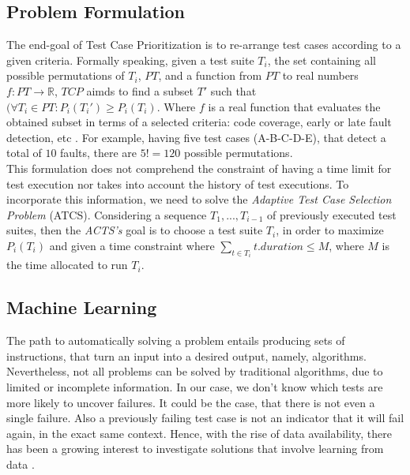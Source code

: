 \subsection{Problem Formulation}

The end-goal of Test Case Prioritization is to re-arrange test cases according to a given criteria. Formally speaking, given a test suite $T_i$, the set containing all possible permutations of $T_i$, $PT$, and a function from $PT$ to real numbers $f : PT \rightarrow \mathbb{R}$, $TCP$ aimds to find a subset $T'$ such that $(\forall T_i \in PT: P_i(T_i') \ge P_i(T_i).$ Where $f$ is a real function that evaluates the obtained subset in terms of a selected criteria: code coverage, early or late fault detection, etc \cite{ShinThesis}. For example, having five test cases (A-B-C-D-E), that detect a total of $10$ faults, there are $5! = 120$ possible permutations.
\\

This formulation does not comprehend the constraint of having a time limit for test execution nor takes into account the history of test executions. To incorporate this information, we need to solve the \textit{Adaptive Test Case Selection Problem} (ATCS). Considering a sequence $T_1, ..., T_{i-1}$ of previously executed test suites, then the \textit{ACTS's} goal is to choose a test suite $T_i$, in order to maximize $P_i(T_i)$ and given a time constraint where $\sum_{t \in T_i} t.duration \le M$, where $M$ is the time allocated to run $T_i$.

\subsection{Machine Learning}

The path to automatically solving a problem entails producing sets of instructions, that turn an input into a desired output, namely, algorithms. Nevertheless, not all problems can be solved by traditional algorithms, due to limited or incomplete information. In our case, we don't know which tests are more likely to uncover failures. It could be the case, that there is not even a single failure. Also a previously failing test case is not an indicator that it will fail again, in the exact same context. Hence, with the rise of data availability, there has been a growing interest to investigate solutions that involve learning from data \cite{durelli}.
\\

